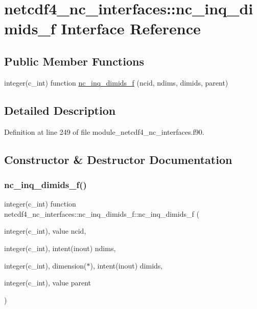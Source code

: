 \hypertarget{interfacenetcdf4__nc__interfaces_1_1nc__inq__dimids__f}{}\section{netcdf4\+\_\+nc\+\_\+interfaces\+:\+:nc\+\_\+inq\+\_\+dimids\+\_\+f Interface Reference}
\label{interfacenetcdf4__nc__interfaces_1_1nc__inq__dimids__f}
\subsection*{Public Member Functions}
\begin{DoxyCompactItemize}
\item 
integer(c\+\_\+int) function \hyperlink{interfacenetcdf4__nc__interfaces_1_1nc__inq__dimids__f_a32a92dea4b4a5ca528af1b74c4f62522}{nc\+\_\+inq\+\_\+dimids\+\_\+f} (ncid, ndims, dimids, parent)
\end{DoxyCompactItemize}


\subsection{Detailed Description}


Definition at line 249 of file module\+\_\+netcdf4\+\_\+nc\+\_\+interfaces.\+f90.



\subsection{Constructor \& Destructor Documentation}
\mbox{\label{interfacenetcdf4__nc__interfaces_1_1nc__inq__dimids__f_a32a92dea4b4a5ca528af1b74c4f62522}} 
\subsubsection{\texorpdfstring{nc\+\_\+inq\+\_\+dimids\+\_\+f()}{nc\_inq\_dimids\_f()}}
{\footnotesize\ttfamily integer(c\+\_\+int) function netcdf4\+\_\+nc\+\_\+interfaces\+::nc\+\_\+inq\+\_\+dimids\+\_\+f\+::nc\+\_\+inq\+\_\+dimids\+\_\+f (\begin{DoxyParamCaption}\item[{integer(c\+\_\+int), value}]{ncid,  }\item[{integer(c\+\_\+int), intent(inout)}]{ndims,  }\item[{integer(c\+\_\+int), dimension($\ast$), intent(inout)}]{dimids,  }\item[{integer(c\+\_\+int), value}]{parent }\end{DoxyParamCaption})}



